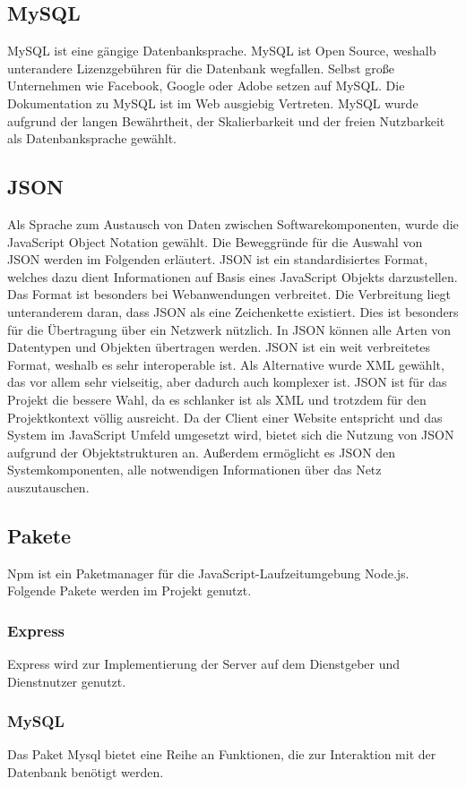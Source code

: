 \documentclass[11pt,
paper=a4,
bibtotocnumbered,	  %
liststotocnumbered,  %
DIV=calc,		  %
tablecaptionabove,	  %
headinclude,
]{article}
\begin{document}
\subsection{MySQL}
MySQL ist eine gängige Datenbanksprache. MySQL ist Open Source, weshalb unterandere Lizenzgebühren für die Datenbank wegfallen. Selbst große Unternehmen wie Facebook, Google oder Adobe setzen auf MySQL. Die Dokumentation zu MySQL ist im Web ausgiebig Vertreten. MySQL wurde aufgrund der langen Bewährtheit, der Skalierbarkeit und der freien Nutzbarkeit als Datenbanksprache gewählt.
\subsection{JSON}
Als Sprache zum Austausch von Daten zwischen Softwarekomponenten, wurde die JavaScript Object Notation gewählt. Die Beweggründe für die Auswahl von JSON werden im Folgenden erläutert.
JSON ist ein standardisiertes Format, welches dazu dient Informationen auf Basis eines JavaScript Objekts darzustellen. Das Format ist besonders bei Webanwendungen verbreitet. Die Verbreitung liegt unteranderem daran, dass JSON als eine Zeichenkette existiert. Dies ist besonders für die Übertragung über ein Netzwerk nützlich. In JSON können alle Arten von Datentypen und Objekten übertragen werden. JSON ist ein weit verbreitetes Format, weshalb es sehr interoperable ist. Als Alternative wurde XML gewählt, das vor allem sehr vielseitig, aber dadurch auch komplexer ist. JSON ist für das Projekt die bessere Wahl, da es schlanker ist als XML und trotzdem für den Projektkontext völlig ausreicht.
Da der Client einer Website entspricht und das System im JavaScript Umfeld umgesetzt wird, bietet sich die Nutzung von JSON aufgrund der Objektstrukturen an. Außerdem ermöglicht es JSON den Systemkomponenten, alle notwendigen Informationen über das Netz auszutauschen.
\subsection{Pakete}
Npm ist ein Paketmanager für die JavaScript-Laufzeitumgebung Node.js. 
Folgende Pakete werden im Projekt genutzt.
\subsubsection{Express}
Express wird zur Implementierung der Server auf dem Dienstgeber und Dienstnutzer genutzt.
\subsubsection{MySQL}
Das Paket Mysql bietet eine Reihe an Funktionen, die zur Interaktion mit der Datenbank benötigt werden.
\end{document}
